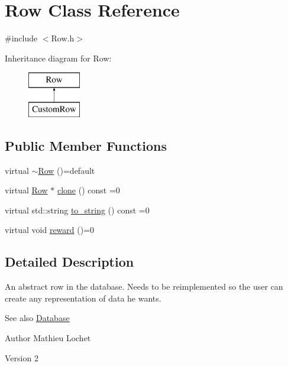 \hypertarget{classRow}{}\section{Row Class Reference}
\label{classRow}


{\ttfamily \#include $<$Row.\+h$>$}

Inheritance diagram for Row\+:\begin{figure}[H]
\begin{center}
\leavevmode
\includegraphics[height=2.000000cm]{classRow}
\end{center}
\end{figure}
\subsection*{Public Member Functions}
\begin{DoxyCompactItemize}
\item 
virtual \mbox{\hyperlink{classRow_acce74b5e3df47d61a3a22388f6c1f552}{$\sim$\+Row}} ()=default
\item 
virtual \mbox{\hyperlink{classRow}{Row}} $\ast$ \mbox{\hyperlink{classRow_ae3e9c3aaa17ebc4f0e280cdec722440a}{clone}} () const =0
\item 
virtual std\+::string \mbox{\hyperlink{classRow_ae7b1aba7a4c868914700432850c2848d}{to\+\_\+string}} () const =0
\item 
virtual void \mbox{\hyperlink{classRow_a851b728fa55ecb26f8ebbc87e614581b}{reward}} ()=0
\end{DoxyCompactItemize}


\subsection{Detailed Description}
An abstract row in the database. Needs to be reimplemented so the user can create any representation of data he wants. \begin{DoxySeeAlso}{See also}
\mbox{\hyperlink{classDatabase}{Database}}
\end{DoxySeeAlso}
\begin{DoxyAuthor}{Author}
Mathieu Lochet 
\end{DoxyAuthor}
\begin{DoxyVersion}{Version}
2 
\end{DoxyVersion}


